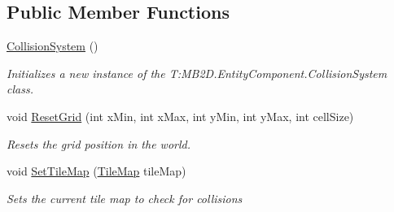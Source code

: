 \subsection*{Public Member Functions}
\begin{DoxyCompactItemize}
\item 
\hyperlink{class_m_b2_d_1_1_entity_component_1_1_collision_system_ac6452aea90e8ee3376b8ea0e089bebc1}{Collision\+System} ()
\begin{DoxyCompactList}\small\item\em Initializes a new instance of the T\+:\+M\+B2\+D.\+Entity\+Component.\+Collision\+System class. \end{DoxyCompactList}\item 
void \hyperlink{class_m_b2_d_1_1_entity_component_1_1_collision_system_a682979b3b811fede89b625cc42b6342c}{Reset\+Grid} (int x\+Min, int x\+Max, int y\+Min, int y\+Max, int cell\+Size)
\begin{DoxyCompactList}\small\item\em Resets the grid position in the world. \end{DoxyCompactList}\item 
void \hyperlink{class_m_b2_d_1_1_entity_component_1_1_collision_system_a4710a6cf7aba7b5ba9c75e0771793b93}{Set\+Tile\+Map} (\hyperlink{class_m_b2_d_1_1_tiles_1_1_tile_map}{Tile\+Map} tile\+Map)
\begin{DoxyCompactList}\small\item\em Sets the current tile map to check for collisions \end{DoxyCompactList}\end{DoxyCompactItemize}
